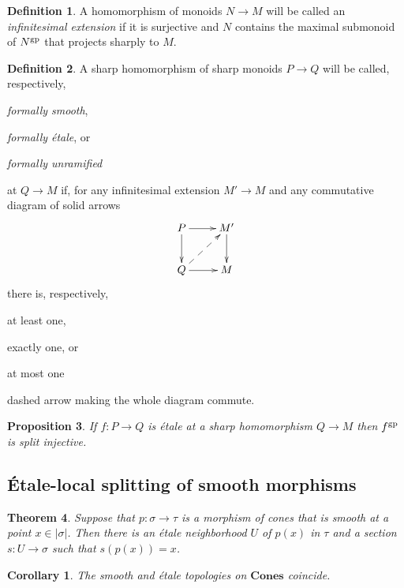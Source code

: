 \documentclass[12pt]{amsart}
\theoremstyle{plan}
\newtheorem{theorem}{Theorem}
\newtheorem{proposition}[theorem]{Proposition}
\newtheorem{corollary}{Corollary}
\numberwithin{lemma}{theorem}
\numberwithin{corollary}{theorem}
\theoremstyle{definition}
\newtheorem{definition}[theorem]{Definition}
\theoremstyle{remark}
\def\Cones{\mathbf{Cones}}
\begin{document}
\begin{definition}
A homomorphism of monoids $N \to M$ will be called an \emph{infinitesimal extension} if it is surjective and $N$ contains the maximal submonoid of $N^{\rm gp}$ that projects sharply to $M$.
\end{definition}

\begin{definition}
A sharp homomorphism of sharp monoids $P \to Q$ will be called, respectively, 
\begin{enumerate*}[label=(\roman{*})] 
\item \emph{formally smooth}, 
\item \emph{formally \'etale}, or 
\item \emph{formally unramified}
\end{enumerate*}
at $Q \to M$ if, for any infinitesimal extension $M' \to M$ and any commutative diagram of solid arrows
\begin{equation*} \xymatrix{
P \ar[r] \ar[d] & M' \ar[d] \\
Q \ar[r] \ar@{-->}[ur] & M
} \end{equation*}
there is, respectively,
\begin{enumerate*}[label=(\roman{*})]
\item at least one,
\item exactly one, or
\item at most one
\end{enumerate*}
dashed arrow making the whole diagram commute.
\end{definition}

\begin{proposition}
If $f: P \to Q$ is \'etale at a sharp homomorphism $Q \to M$ then $f^{\rm gp}$ is split injective.
\end{proposition}

\subsection{\'Etale-local splitting of smooth morphisms}

\begin{theorem}
Suppose that $p : \sigma \to \tau$ is a morphism of cones that is smooth at a point $x \in |\sigma|$.  Then there is an \'etale neighborhood $U$ of $p(x)$ in $\tau$ and a section $s : U \to \sigma$ such that $s(p(x)) = x$.
\end{theorem}

\begin{corollary}
The smooth and \'etale topologies on $\Cones$ coincide.
\end{corollary}
\end{document}
